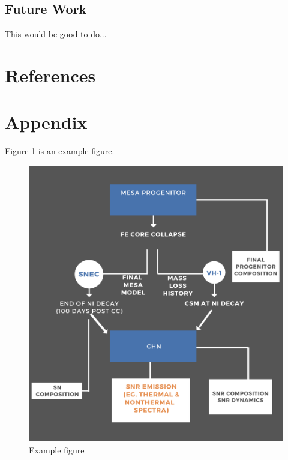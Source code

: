 \documentclass[12pt]{article}
\begin{document}
\subsection{Future Work}
This would be good to do...

\newpage
\section{References}
{\def\section*#1{}
\singlespacing


}
\newpage
{}



\doublespacing
\appendix


\section{Appendix}\label{appendixlabel}
Figure \ref{fig:snr_pipeline} is an example figure.
\begin{figure}[htb!]
    \centering
    \includegraphics[width=\textwidth]{SNR_pipeline.png}
    \caption{Example figure}
    \label{fig:snr_pipeline}
\end{figure}
\end{document}
